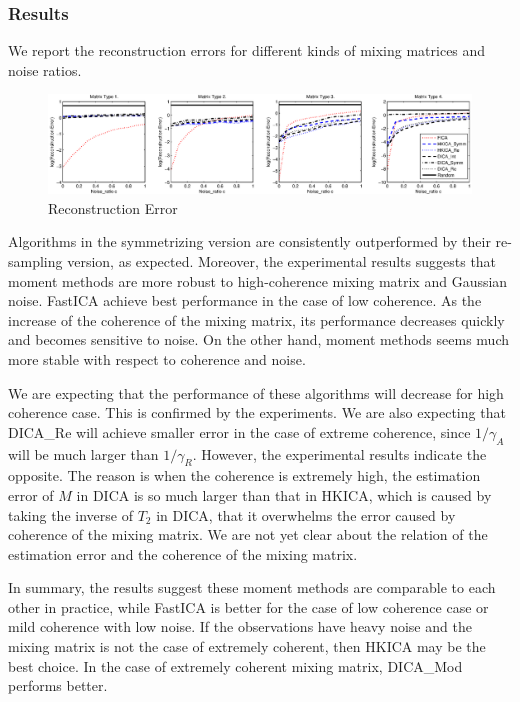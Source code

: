 \documentclass[twoside]{article}
\theoremstyle{definition}
\begin{document}
\subsubsection{Results}
\label{subsubsec:results}
We report the reconstruction errors for different kinds of mixing matrices and noise ratios.

\begin{figure}[pt]
\label{fig:Error}
\centering
	\includegraphics[width = \linewidth]{error}
\caption{Reconstruction Error}
\end{figure}

Algorithms in the symmetrizing version are consistently outperformed by their re-sampling version, as expected. 
Moreover, the experimental results suggests that moment methods are more robust to high-coherence mixing matrix and Gaussian noise.
FastICA achieve best performance in the case of low coherence.
As the increase of the coherence of the mixing matrix, its performance decreases quickly and becomes sensitive to noise.
On the other hand, moment methods seems much more stable with respect to coherence and noise.

We are expecting that the performance of these algorithms will decrease for high coherence case. 
This is confirmed by the experiments. 
We are also expecting that DICA\_Re will achieve smaller error in the case of extreme coherence, since $1/\gamma_A$ will be much larger than $1/\gamma_R$. 
However, the experimental results indicate the opposite. 
The reason is when the coherence is extremely high, the estimation error of $M$ in DICA is so much larger than that in HKICA, which is caused by taking the inverse of $T_2$ in DICA, that it overwhelms the error caused by coherence of the mixing matrix.
We are not yet clear about the relation of the estimation error and the coherence of the mixing matrix.

In summary, the results suggest these moment methods are comparable to each other in practice,
while FastICA  is better for the case of low coherence case or mild coherence with low noise.
If the observations have heavy noise and the mixing matrix is not the case of extremely coherent, then HKICA may be the best choice.
In the case of extremely coherent mixing matrix, DICA\_Mod performs better.
\end{document}
